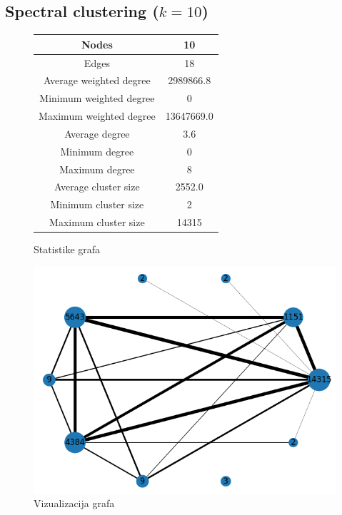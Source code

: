 \documentclass[a4paper,12pt]{article}
\begin{document}
	\subsection{Spectral clustering ($k = 10$)}
	\begin{figure}[H]
		\centering
		\begin{tabular}{ |c|c| } 
			\hline
			Nodes& 10 \\
			\hline
			Edges& 18 \\
			\hline
			Average weighted degree& 2989866.8 \\
			Minimum weighted degree& 0  \\
			Maximum weighted degree& 13647669.0 \\
			\hline
			Average degree& 3.6 \\
			Minimum degree& 0 \\ 
			Maximum degree& 8 \\
			\hline
			Average cluster size& 2552.0 \\
			Minimum cluster size& 2 \\
			Maximum cluster size& 14315 \\
			\hline
			
		\end{tabular}
		\caption{Statistike grafa}
	\end{figure}
	
	\begin{figure}[H]
		\centering
		\includegraphics[scale=0.7]{spectral_merged_graph_10_visualization}
		\caption{Vizualizacija grafa}
	\end{figure}
\end{document}
